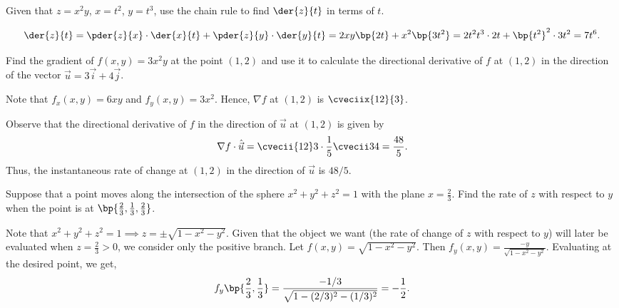 \begin{problem}
    Given that $z = x^2y$, $x = t^2$, $y = t^3$, use the chain rule to find $\der{z}{t}$ in terms of $t$.
\end{problem}
\begin{solution}
    \[\der{z}{t} = \pder{z}{x} \cdot \der{x}{t} + \pder{z}{y} \cdot \der{y}{t} = 2xy \bp{2t} + x^2 \bp{3t^2} = 2t^2t^3 \cdot 2t + \bp{t^2}^2 \cdot 3t^2 = 7t^6.\]
\end{solution}

\begin{problem}
    Find the gradient of $f(x, y) = 3x^2y$ at the point $(1, 2)$ and use it to calculate the directional derivative of $f$ at $(1, 2)$ in the direction of the vector $\vec u = 3\vec i + 4\vec j$.
\end{problem}
\begin{solution}
    Note that $f_x(x, y) = 6xy$ and $f_y(x, y) = 3x^2$. Hence, $\nabla f$ at $(1, 2)$ is $\cveciix{12}{3}$. 
            
    Observe that the directional derivative of $f$ in the direction of $\vec u$ at $(1, 2)$ is given by \[\nabla f \cdot \hat{\vec u} = \cvecii{12}3 \cdot \frac15 \cvecii34 = \frac{48}5.\] Thus, the instantaneous rate of change at $(1, 2)$ in the direction of $\vec u$ is $48/5$.
\end{solution}

\begin{problem}
    Suppose that a point moves along the intersection of the sphere $x^2 + y^2 + z^2 = 1$ with the plane $x = \frac23$. Find the rate of $z$ with respect to $y$ when the point is at $\bp{\frac23, \frac13, \frac23}$.
\end{problem}
\begin{solution}
    Note that $x^2 + y^2 + z^2 = 1 \implies z = \pm \sqrt{1 - x^2 - y^2}$. Given that the object we want (the rate of change of $z$ with respect to $y$) will later be evaluated when $z = \frac23 > 0$, we consider only the positive branch. Let $f(x, y) = \sqrt{1 - x^2 - y^2}$. Then $f_y(x, y) = \frac{-y}{\sqrt{1 - x^2 - y^2}}$. Evaluating at the desired point, we get, \[f_y\bp{\frac23, \frac13} = \frac{-1/3}{\sqrt{1 - (2/3)^2 - (1/3)^2}} = -\frac12.\]
\end{solution}

